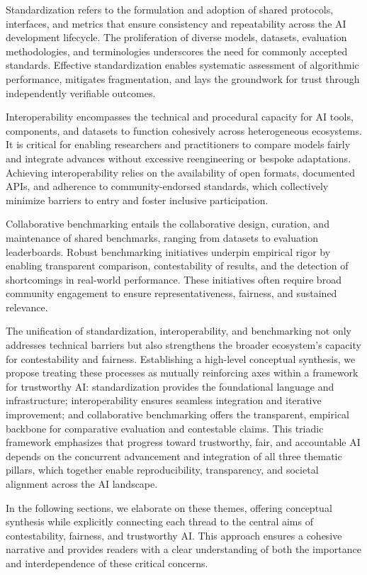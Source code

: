 \documentclass[sigconf]{acmart}
\begin{document}
Standardization refers to the formulation and adoption of shared protocols, interfaces, and metrics that ensure consistency and repeatability across the AI development lifecycle. The proliferation of diverse models, datasets, evaluation methodologies, and terminologies underscores the need for commonly accepted standards. Effective standardization enables systematic assessment of algorithmic performance, mitigates fragmentation, and lays the groundwork for trust through independently verifiable outcomes.

Interoperability encompasses the technical and procedural capacity for AI tools, components, and datasets to function cohesively across heterogeneous ecosystems. It is critical for enabling researchers and practitioners to compare models fairly and integrate advances without excessive reengineering or bespoke adaptations. Achieving interoperability relies on the availability of open formats, documented APIs, and adherence to community-endorsed standards, which collectively minimize barriers to entry and foster inclusive participation.

Collaborative benchmarking entails the collaborative design, curation, and maintenance of shared benchmarks, ranging from datasets to evaluation leaderboards. Robust benchmarking initiatives underpin empirical rigor by enabling transparent comparison, contestability of results, and the detection of shortcomings in real-world performance. These initiatives often require broad community engagement to ensure representativeness, fairness, and sustained relevance.

The unification of standardization, interoperability, and benchmarking not only addresses technical barriers but also strengthens the broader ecosystem's capacity for contestability and fairness. Establishing a high-level conceptual synthesis, we propose treating these processes as mutually reinforcing axes within a framework for trustworthy AI: standardization provides the foundational language and infrastructure; interoperability ensures seamless integration and iterative improvement; and collaborative benchmarking offers the transparent, empirical backbone for comparative evaluation and contestable claims. This triadic framework emphasizes that progress toward trustworthy, fair, and accountable AI depends on the concurrent advancement and integration of all three thematic pillars, which together enable reproducibility, transparency, and societal alignment across the AI landscape.

In the following sections, we elaborate on these themes, offering conceptual synthesis while explicitly connecting each thread to the central aims of contestability, fairness, and trustworthy AI. This approach ensures a cohesive narrative and provides readers with a clear understanding of both the importance and interdependence of these critical concerns.
\end{document}
